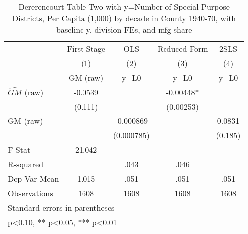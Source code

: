 \begin{table}[htbp]\centering
\def\sym#1{\ifmmode^{#1}\else\(^{#1}\)\fi}
\caption{Dererencourt Table Two with y=Number of Special Purpose Districts, Per Capita (1,000) by decade in County 1940-70, with baseline y, division FEs, and mfg share}
\begin{tabular}{l*{4}{c}}
\toprule
                    & First Stage   &         OLS   &Reduced Form   &        2SLS   \\
                    &\multicolumn{1}{c}{(1)}&\multicolumn{1}{c}{(2)}&\multicolumn{1}{c}{(3)}&\multicolumn{1}{c}{(4)}\\
                    &\multicolumn{1}{c}{GM  (raw)}&\multicolumn{1}{c}{y\_L0}&\multicolumn{1}{c}{y\_L0}&\multicolumn{1}{c}{y\_L0}\\
\midrule
$\hat{GM}$ (raw)    &     -0.0539   &               &    -0.00448*  &               \\
                    &     (0.111)   &               &   (0.00253)   &               \\
\addlinespace
GM  (raw)           &               &   -0.000869   &               &      0.0831   \\
                    &               &  (0.000785)   &               &     (0.185)   \\
\midrule
F-Stat              &      21.042   &               &               &               \\
R-squared           &               &        .043   &        .046   &               \\
Dep Var Mean        &       1.015   &        .051   &        .051   &        .051   \\
Observations        &        1608   &        1608   &        1608   &        1608   \\
\bottomrule
\multicolumn{5}{l}{\footnotesize Standard errors in parentheses}\\
\multicolumn{5}{l}{\footnotesize * p<0.10, ** p<0.05, *** p<0.01}\\
\end{tabular}
\end{table}
